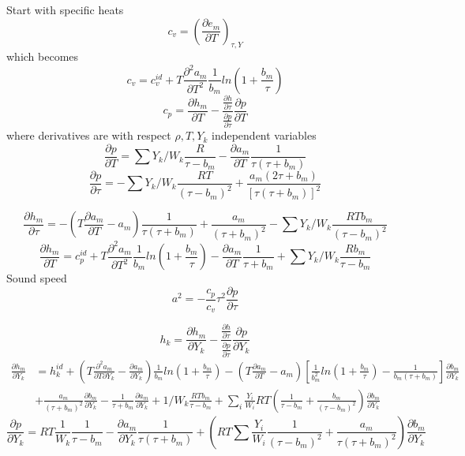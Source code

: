 \documentclass[11pt]{article}
\begin{document}
Start with specific heats
\[
c_v = \left( \frac{\partial e_m}{\partial T}\right)_{\tau,Y}
\]
which becomes
\[
c_v = c_v^{id} + T \frac{\partial^2 a_m}{\partial T^2} \frac{1}{b_m} ln ( 1 + \frac{b_m}{\tau})
\]
\[
c_p =  \frac{\partial h_m}{\partial T}
- \frac {\frac{\partial h}{\partial \tau}} 
 {\frac{\partial p}{\partial \tau}}
\frac{\partial p}{\partial T}
\]
where derivatives are with respect $\rho, T, Y_k$ independent variables
\[
\frac{\partial p}{\partial T} = \sum Y_k / W_k  \frac{R}{\tau-b_m} - \frac{\partial a_m}{\partial T} \frac{1}{\tau(\tau +b_m)}
\]
\[
\frac{\partial p}{\partial \tau} = -
\sum Y_k / W_k  \frac{R T}{(\tau-b_m)^2} + \frac{a_m (2 \tau + b_m)}{[\tau(\tau +b_m)]^2}
\]

\vspace{\baselineskip}
\[
\frac{\partial h_m}{\partial \tau} =
-(T \frac{\partial a_m}{\partial T}  - a_m )
\frac{1}{\tau(\tau+b_m)}
+ \frac{a_m}{(\tau+b_m)^2}
-\sum Y_k / W_k  \frac{R T b_m}{(\tau-b_m)^2} 
\]
\vspace{\baselineskip}
\[
\frac{\partial h_m}{\partial T} = c_p^{id}
+T \frac{\partial^2 a_m}{\partial T^2} 
\frac{1}{b_m} ln ( 1 + \frac{b_m}{\tau})
- \frac{\partial a_m}{\partial T} 
\frac{1}{\tau+b_m}
+\sum Y_k / W_k  \frac{R b_m}{\tau-b_m} 
\]
Sound speed
\[
a^2 = -\frac{c_p}{c_v} \tau^2  \frac{\partial p}{\partial \tau}
\]

\[
h_k = \frac{\partial h_m}{\partial Y_k }
- \frac {\frac{\partial h}{\partial \tau}} 
 {\frac{\partial p}{\partial \tau}}
 \frac{\partial p}{\partial Y_k}
\]
\begin{align}
\frac{\partial h_m}{\partial Y_k } &=  h_k^{id}
+ (T \frac{\partial^2 a_m}{\partial T \partial Y_k}  - \frac{\partial a_m }{\partial Y_k})
\frac{1}{b_m} ln(1+ \frac{b_m}{\tau})
-(T \frac{\partial a_m}{\partial T}  - a_m ) \left[ \frac{1}{b_m^2} ln(1+ \frac{b_m}{\tau})
- \frac{1}{b_m(\tau+b_m)}
\right ] \frac{\partial b_m}{\partial Y_k} \nonumber \\
&+ \frac{a_m}{(\tau+b_m)^2}  \frac{\partial b_m}{\partial Y_k}
- \frac{1}{\tau+b_m}  \frac{\partial a_m}{\partial Y_k}
+ 1 / W_k  \frac{R T b_m}{\tau-b_m}+
\sum_i \frac{Y_i}{W_i} R T ( \frac{1}{\tau -b_m} + \frac{b_m}{(\tau-b_m)^2} ) \frac{ \partial b_m}{\partial Y_k} 
\end{align}
\[
 \frac{\partial p}{\partial Y_k}
= 
 R T \frac{1}{W_k} \frac{1}{\tau - b_m} - \frac{\partial a_m}{\partial Y_k} \frac{1}{\tau(\tau + b_m)}
+\left(R T \sum \frac{Y_i}{W_i} \frac{1}{(\tau - b_m)^2} + \frac{a_m}{\tau(\tau + b_m)^2} \right ) \frac{\partial b_m}{\partial Y_k}
\]
\end{document}

